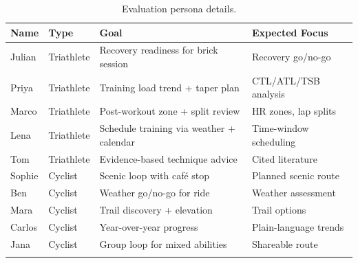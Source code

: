\begin{table}[ht]
\begin{center}
\begin{minipage}{\textwidth}
\caption{Evaluation persona details.}\label{tab:personas}
\begin{tabularx}{\textwidth}{llXp{3.5cm}}
\toprule
\textbf{Name} & \textbf{Type} & \textbf{Goal} & \textbf{Expected Focus} \\
\midrule
Julian & Triathlete & Recovery readiness for brick session & Recovery go/no-go \\
Priya & Triathlete & Training load trend + taper plan & CTL/ATL/TSB analysis \\
Marco & Triathlete & Post-workout zone + split review & HR zones, lap splits \\
Lena & Triathlete & Schedule training via weather + calendar & Time-window scheduling \\
Tom & Triathlete & Evidence-based technique advice & Cited literature \\
\addlinespace
Sophie & Cyclist & Scenic loop with caf\'{e} stop & Planned scenic route \\
Ben & Cyclist & Weather go/no-go for ride & Weather assessment \\
Mara & Cyclist & Trail discovery + elevation & Trail options \\
Carlos & Cyclist & Year-over-year progress & Plain-language trends \\
Jana & Cyclist & Group loop for mixed abilities & Shareable route \\
\botrule
\end{tabularx}
\end{minipage}
\end{center}
\end{table}
